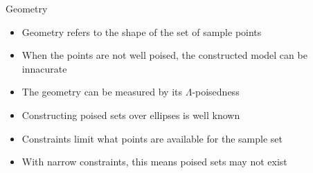 \documentclass{beamer}
\begin{document}


\begin{frame}{Geometry}
    \begin{itemize}
        \item<1, 2, 3> Geometry refers to the shape of the set of sample points
        \item<1, 2, 3> When the points are not well poised, the constructed model can be innacurate \\
        \item<3> The geometry can be measured by its $\Lambda$-poisedness
        \item<3> Constructing poised sets over ellipses is well known
        \item<3> Constraints limit what points are available for the sample set
        \item<3> With narrow constraints, this means poised sets may not exist
    \end{itemize}
\end{frame}
\end{document}
